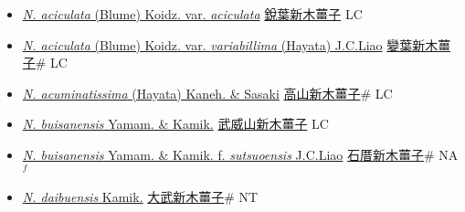 \begin{itemize}
  \begin{itemize}
        \item[] \href{http://www.theplantlist.org/tpl1.1/search?q=Neolitsea+aciculata+var.+aciculata}{\textit{N. aciculata} (Blume) Koidz. var. \textit{aciculata}}   \href{\detokenize{http://taibnet.sinica.edu.tw/chi/taibnet_species_list.php?T2=銳葉新木薑子&T2_new_value=true&fr=y}}{銳葉新木薑子} LC
        \item[] \href{http://www.theplantlist.org/tpl1.1/search?q=Neolitsea+aciculata+var.+variabillima}{\textit{N. aciculata} (Blume) Koidz. var. \textit{variabillima} (Hayata) J.C.Liao}   \href{\detokenize{http://taibnet.sinica.edu.tw/chi/taibnet_species_list.php?T2=變葉新木薑子&T2_new_value=true&fr=y}}{變葉新木薑子}\# LC
        \item[] \href{http://www.theplantlist.org/tpl1.1/search?q=Neolitsea+acuminatissima}{\textit{N. acuminatissima} (Hayata) Kaneh. \& Sasaki}   \href{\detokenize{http://taibnet.sinica.edu.tw/chi/taibnet_species_list.php?T2=高山新木薑子&T2_new_value=true&fr=y}}{高山新木薑子}\# LC
        \item[] \href{http://www.theplantlist.org/tpl1.1/search?q=Neolitsea+buisanensis}{\textit{N. buisanensis} Yamam. \& Kamik.}   \href{\detokenize{http://taibnet.sinica.edu.tw/chi/taibnet_species_list.php?T2=武威山新木薑子&T2_new_value=true&fr=y}}{武威山新木薑子} LC
        \item[] \href{http://www.theplantlist.org/tpl1.1/search?q=Neolitsea+buisanensis+ f. +sutsuoensis}{\textit{N. buisanensis} Yamam. \& Kamik.  f.  \textit{sutsuoensis} J.C.Liao}   \href{\detokenize{http://taibnet.sinica.edu.tw/chi/taibnet_species_list.php?T2=石厝新木薑子&T2_new_value=true&fr=y}}{石厝新木薑子}\# NA$^f$
        \item[] \href{http://www.theplantlist.org/tpl1.1/search?q=Neolitsea+daibuensis}{\textit{N. daibuensis} Kamik.}   \href{\detokenize{http://taibnet.sinica.edu.tw/chi/taibnet_species_list.php?T2=大武新木薑子&T2_new_value=true&fr=y}}{大武新木薑子}\# NT

\end{itemize}
\end{itemize}
